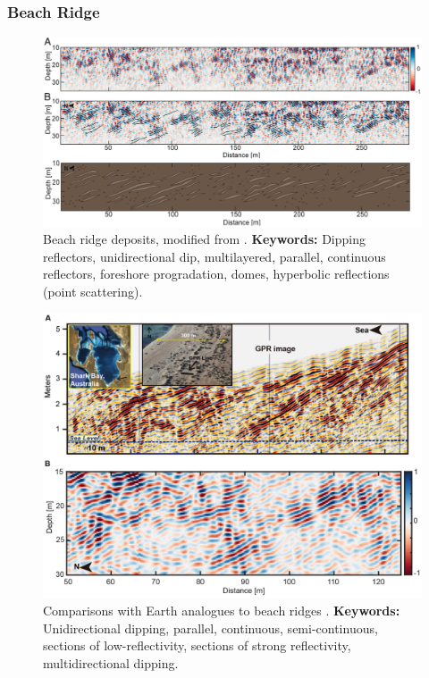 \subsubsection{Beach Ridge}
\begin{figure}[h!]
    \centering
    \includegraphics[width=0.9\linewidth]{Figures/0.6RoPeR/Li2025_1_3.png}
    \caption[Beach ridge deposits]{Beach ridge deposits, modified from \citep{Li2025}. \textbf{Keywords:} Dipping reflectors, unidirectional dip, multilayered, parallel, continuous reflectors, foreshore progradation, domes, hyperbolic reflections (point scattering).}
    \label{fig:Li2025-1-3}
\end{figure}

\begin{figure}[h!]
    \centering
    \includegraphics[width=0.9\linewidth]{Figures/0.6RoPeR/Li2025_2.png}
    \caption[Comparisons with Earth analogues to beach ridges]{Comparisons with Earth analogues to beach ridges \citep{Li2025}. \textbf{Keywords:} Unidirectional dipping, parallel, continuous, semi-continuous, sections of low-reflectivity, sections of strong reflectivity, multidirectional dipping.}
    \label{fig:Li2025-2}
\end{figure}